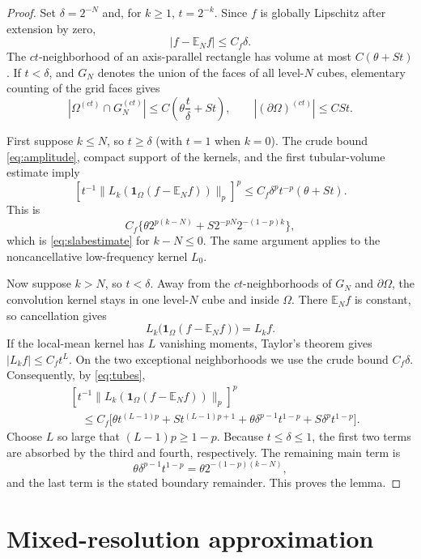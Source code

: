 \documentclass[11pt]{article}
\newcommand{\E}{\mathbb E}
\newcommand{\1}{\mathbf 1}
\begin{document}
\begin{proof}
Set $\delta=2^{-N}$ and, for $k\ge1$, $t=2^{-k}$.  Since $f$ is globally
Lipschitz after extension by zero,
\begin{equation}\label{eq:amplitude}
                    |f-\E_Nf|\le C_f\delta.
\end{equation}
The $ct$-neighborhood of an axis-parallel rectangle has volume at most
$C(\theta+St)$.  If $t<\delta$, and $G_N$ denotes the union of the faces of
all level-$N$ cubes, elementary counting of the grid faces gives
\begin{equation}\label{eq:tubes}
 |\Omega^{(ct)}\cap G_N^{(ct)}|
 \le C\left(\theta\frac t\delta+St\right),
 \qquad |(\partial\Omega)^{(ct)}|\le CSt.
\end{equation}

First suppose $k\le N$, so $t\ge\delta$ (with $t=1$ when $k=0$).
The crude bound \eqref{eq:amplitude}, compact support of the kernels, and the
first tubular-volume estimate imply
\[
 [t^{-1}\|L_k(\1_\Omega(f-\E_Nf))\|_p]^p
 \le C_f\delta^pt^{-p}(\theta+St).
\]
This is
\[
 C_f\{\theta 2^{p(k-N)}+S2^{-pN}2^{-(1-p)k}\},
\]
which is \eqref{eq:slabestimate} for $k-N\le0$.  The same argument applies
to the noncancellative low-frequency kernel $L_0$.

Now suppose $k>N$, so $t<\delta$.  Away from the $ct$-neighborhoods of
$G_N$ and $\partial\Omega$, the convolution kernel stays in one level-$N$
cube and inside $\Omega$.  There $\E_Nf$ is constant, so cancellation gives
\[
 L_k\bigl(\1_\Omega(f-\E_Nf)\bigr)=L_kf.
\]
If the local-mean kernel has $L$ vanishing moments, Taylor's theorem gives
$|L_kf|\le C_f t^L$.  On the two exceptional neighborhoods we use the
crude bound $C_f\delta$.  Consequently, by \eqref{eq:tubes},
\begin{align*}
 &[t^{-1}\|L_k(\1_\Omega(f-\E_Nf))\|_p]^p\\
 &\quad\le C_f\bigl[
   \theta t^{(L-1)p}+S t^{(L-1)p+1}
   +\theta\delta^{p-1}t^{1-p}+S\delta^pt^{1-p}
 \bigr].
\end{align*}
Choose $L$ so large that $(L-1)p\ge1-p$.  Because $t\le\delta\le1$, the
first two terms are absorbed by the third and fourth, respectively.  The
remaining main term is
\[
 \theta\delta^{p-1}t^{1-p}
 =\theta 2^{-(1-p)(k-N)},
\]
and the last term is the stated boundary remainder.  This proves the lemma.
\end{proof}

\section{Mixed-resolution approximation}
\end{document}
